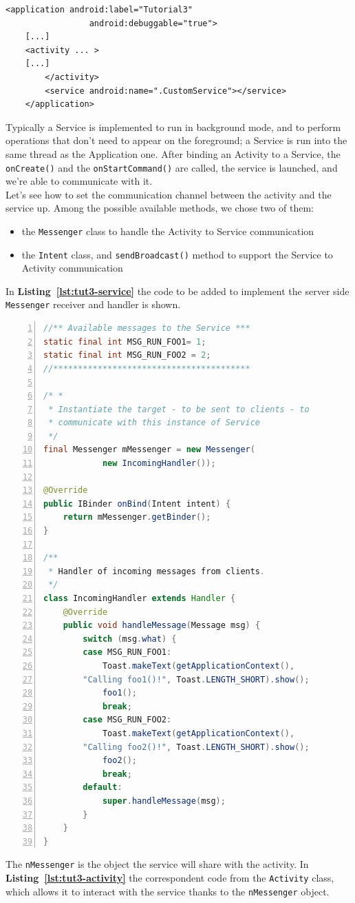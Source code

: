 \documentclass[a4paper,10pt]{article}
\newcommand{\keyword}[1]{\texttt{#1}}
\newcommand{\refl}[1]{\textbf{Listing~\ref{#1}}}
\begin{document}
\begin{multicols}{2}
\begin{lstlisting}
<application android:label="Tutorial3"
                 android:debuggable="true">
	[...]
	<activity ... >
	[...]
        </activity>
        <service android:name=".CustomService"></service> 
    </application>
\end{lstlisting}
Typically a Service is implemented to run in background mode, and to perform
operations that don't need to appear on the foreground; a Service is run into
the same thread as the Application one. After binding an Activity to a Service,
the \keyword{onCreate()} and the \keyword{onStartCommand()} are called, the
service is launched, and we're able to communicate with it.\\
Let's see how to set the communication channel between the activity and the
service up. Among the possible available methods, we chose two of them:
\begin{itemize}
\item the \keyword{Messenger} class to handle the Activity to Service
communication
\item the \keyword{Intent} class, and \keyword{sendBroadcast()} method to
support the Service to Activity communication
\end{itemize}
In \refl{lst:tut3-service} the code to be added to implement the server side
\keyword{Messenger} receiver and handler is shown.
\begin{lstlisting}[language=Java,
		   columns=fullflexible,
		   showstringspaces=false,
		   xleftmargin=15pt,
		   frame = l,
		   numbers=left,
		   commentstyle=\color{gray}\upshape,
		   caption=Tutorial3Service.java - message handling,
		   label=lst:tut3-service]
//** Available messages to the Service ***
static final int MSG_RUN_FOO1= 1;
static final int MSG_RUN_FOO2 = 2;
//****************************************

/* *
 * Instantiate the target - to be sent to clients - to
 * communicate with this instance of Service
 */
final Messenger mMessenger = new Messenger(
			new IncomingHandler());

@Override
public IBinder onBind(Intent intent) {
	return mMessenger.getBinder();
}

/**
 * Handler of incoming messages from clients.
 */
class IncomingHandler extends Handler {
	@Override
	public void handleMessage(Message msg) {
		switch (msg.what) {
		case MSG_RUN_FOO1:
			Toast.makeText(getApplicationContext(),
		"Calling foo1()!", Toast.LENGTH_SHORT).show();
			foo1();
			break;
		case MSG_RUN_FOO2:
			Toast.makeText(getApplicationContext(),
		"Calling foo2()!", Toast.LENGTH_SHORT).show();
			foo2();
			break;
		default:
			super.handleMessage(msg);
		}
	}
}
\end{lstlisting}
The \keyword{nMessenger} is the object the service will share with the activity.
In \refl{lst:tut3-activity} the correspondent code from the \keyword{Activity} class, which allows it
to interact with the service thanks to the \keyword{nMessenger} object.


\end{multicols}
\end{document}

